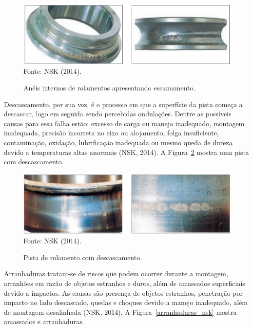 \documentclass[
	12pt,				
	oneside,			
	a4paper,			
	english,			
	brazil,			
	]{abntex2ppgsi}
\begin{document}
\begin{figure}[H]
\centering
\caption {Anéis internos de rolamentos apresentando escamamento.}
\includegraphics[width=\textwidth,height=\textheight,keepaspectratio]{escamamento_nsk} \\
Fonte: NSK (2014).
\label{escamemento_nsk}
\end{figure}

Descascamento, por sua vez, é o processo em que a superfície da pista começa a descascar, logo em seguida sendo percebidas ondulações. Dentre as possíveis causas para essa falha estão: excesso de carga ou manejo inadequado, montagem inadequada, precisão incorreta no eixo ou alojamento, folga insuficiente, contaminação, oxidação, lubrificação inadequada ou mesmo queda de dureza devido a temperaturas altas anormais (NSK, 2014). A Figura~\ref{descascamento_nsk} mostra uma pista com descascamento.

\begin{figure}[H]
\centering
\caption {Pista de rolamento com descascamento.}
\includegraphics[width=\textwidth,height=\textheight,keepaspectratio]{descascamento_nsk} \\
Fonte: NSK (2014).
\label{descascamento_nsk}
\end{figure}

Arranhaduras tratam-se de riscos que podem ocorrer durante a montagem, arranhões em razão de objetos estranhos e duros, além de amassados superficiais devido a impactos. As causas são presença de objetos estranhos, penetração por impacto no lado descascado, quedas e choques devido a manejo inadequado, além de montagem desalinhada (NSK, 2014). A Figura~\ref{arranhaduras_nsk} mostra amassados e arranhaduras. 
\end{document}
